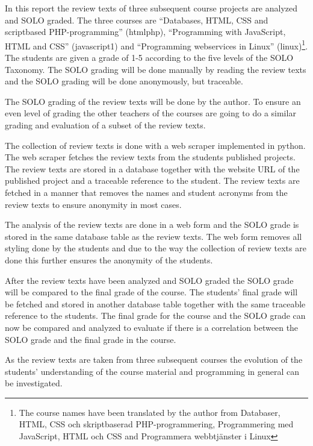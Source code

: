 \documentclass[twoside,twocolumn,a4paper,11pt,english]{article}
\begin{document}

In this report the review texts of three subsequent course projects are analyzed and SOLO graded. The three courses are ``Databases, HTML, CSS and scriptbased PHP-programming'' (htmlphp), ``Programming with JavaScript, HTML and CSS'' (javascript1) and ``Programming webservices in Linux'' (linux)\footnote{The course names have been translated by the author from Databaser, HTML, CSS och skriptbaserad PHP-programmering, Programmering med JavaScript, HTML och CSS and Programmera webbtjänster i Linux}. The students are given a grade of 1-5 according to the five levels of the SOLO Taxonomy. The SOLO grading will be done manually by reading the review texts and the SOLO grading will be done anonymously, but traceable.

The SOLO grading of the review texts will be done by the author. To ensure an even level of grading the other teachers of the courses are going to do a similar grading and evaluation of a subset of the review texts.

The collection of review texts is done with a web scraper implemented in python. The web scraper fetches the review texts from the students published projects. The review texts are stored in a database together with the website URL of the published project and a traceable reference to the student. The review texts are fetched in a manner that removes the names and student acronyms from the review texts to ensure anonymity in most cases.

The analysis of the review texts are done in a web form and the SOLO grade is stored in the same database table as the review texts. The web form removes all styling done by the students and due to the way the collection of review texts are done this further ensures the anonymity of the students.

After the review texts have been analyzed and SOLO graded the SOLO grade will be compared to the final grade of the course. The students' final grade will be fetched and stored in another database table together with the same traceable reference to the students. The final grade for the course and the SOLO grade can now be compared and analyzed to evaluate if there is a correlation between the SOLO grade and the final grade in the course.


As the review texts are taken from three subsequent courses the evolution of the students' understanding of the course material and programming in general can be investigated.
\end{document}
